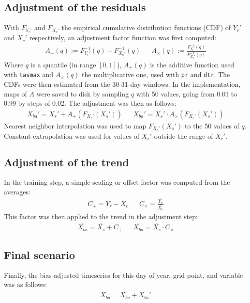 \documentclass[letterpaper,10pt]{article}
\begin{document}
\subsection{Adjustment of the residuals}
With $F_{Y_r'}$ and $F_{X_c'}$ the empirical cumulative distribution functions (CDF) of $Y_r'$ and $X_c'$ respectively, an adjustment factor function was first computed:
\begin{align}
A_+(q) := F^{-1}_{Y_r'}\left(q\right) - F^{-1}_{X_c'}\left(q\right)  && A_\times(q) := \frac{F^{-1}_{Y_r'}\left(q\right)}{F^{-1}_{X_c'}\left(q\right)}
\end{align}
Where $q$ is a quantile (in range $[0, 1]$), $A_+(q)$ is the additive function used with \texttt{tasmax} and $A_\times(q)$ the multiplicative one, used with \texttt{pr} and \texttt{dtr}.
The CDFs were then estimated from the 30 31-day windows.
In the implementation, maps of $A$ were saved to disk by sampling $q$ with 50 values, going from 0.01 to 0.99 by steps of 0.02.
The adjustment was then as follows:
\begin{align}
X_{ba}' = X_s' + A_+\left(F_{X_c'}(X_s')\right) && X_{ba}' = X_s' \cdot A_\times\left(F_{X_c'}(X_s')\right)
\end{align}
Nearest neighbor interpolation was used to map $F_{X_c'}(X_s')$ to the 50 values of $q$.
Constant extrapolation was used for values of $X_s'$ outside the range of $X_c'$.

\subsection{Adjustment of the trend}
In the training step, a simple scaling or offset factor was computed from the averages:
\begin{align}
C_+ = \overline{Y_r} - \overline{X_c} && C_\times = \frac{\overline{Y_r}}{\overline{X_c}}
\end{align}
This factor was then applied to the trend in the adjustment step:
\begin{align}
\overline{X_{ba}} = \overline{X_s} + C_+  && \overline{X_{ba}} = \overline{X_s}\cdot C_\times
\end{align}

\subsection{Final scenario}
Finally, the bias-adjusted timeseries for this day of year, grid point, and variable was as follows:
\begin{align}
X_{ba} = \overline{X_{ba}} + X_{ba}'
\end{align}
\end{document}
